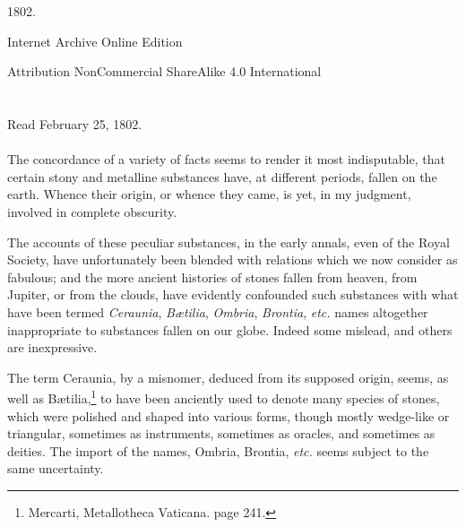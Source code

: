 \documentclass[a4paper, 12pt, oneside]{article}
\begin{document}
\begin{titlepage}
	
		
	\vspace*{\fill}%
	
	1802.%
	
	\vspace{1\baselineskip} %

        Internet Archive Online Edition  %
	
	{\small Attribution NonCommercial ShareAlike 4.0 International } %
\end{titlepage}
\setlength{\parskip}{1mm plus1mm minus1mm}
\setcounter{tocdepth}{3}
\setcounter{secnumdepth}{3}
\section*{}
\begin{center}
Read February 25, 1802.
\end{center}
\paragraph{}
The concordance of a variety of facts seems to render it most indisputable, that certain stony and metalline substances have, at different periods, fallen on the earth. Whence their origin, or whence they came, is yet, in my judgment, involved in complete obscurity.

The accounts of these peculiar substances, in the early annals, even of the Royal Society, have unfortunately been blended with relations which we now consider as fabulous; and the more ancient histories of stones fallen from heaven, from Jupiter, or from the clouds, have evidently confounded such substances with what have been termed \emph{Ceraunia}, \emph{Bætilia}, \emph{Ombria}, \emph{Brontia}, \emph{etc.} names altogether inappropriate to substances fallen on our globe. Indeed some mislead, and others are inexpressive.

The term Ceraunia, by a misnomer, deduced from its supposed origin, seems, as well as Bætilia,\footnote{Mercarti, Metallotheca Vaticana. page 241.} to have been anciently used to denote many species of stones, which were polished and shaped into various forms, though mostly wedge-like or triangular, sometimes as instruments, sometimes as oracles, and sometimes as deities. The import of the names, Ombria, Brontia, \emph{etc.} seems subject to the same uncertainty.
\end{document}
